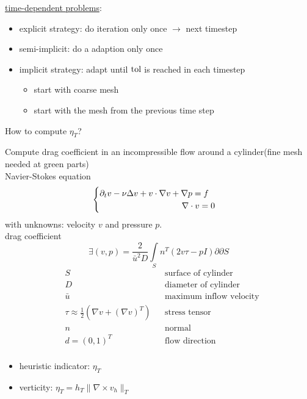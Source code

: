 \underline{time-dependent problems}:
\begin{itemize}
	\item explicit strategy: do iteration only once $\to$ next timestep
	\item semi-implicit: do a adaption only once
	\item implicit strategy: adapt until $\text{tol}$ is reached in each timestep
	\begin{itemize}
		\item start with coarse mesh
		\item start with the mesh from the previous time step
	\end{itemize}
\end{itemize}
How to compute $\eta_T$?\vspace{1cm}
\begin{example}
	Compute drag coefficient in an incompressible flow around a cylinder(fine mesh needed at green parts)\\
	Navier-Stokes equation
	\begin{align*}
	\begin{cases}
	\partial_t v - \nu \laplace v + v \cdot \nabla v + \nabla p = f\\
	\hspace{3.4cm}\nabla \cdot v = 0
	\end{cases}
	\end{align*}
	with unknowns: velocity $v$ and pressure $p$.\\
	drag coefficient 
	\begin{equation*}
		\exists (v,p) = \frac{2}{\bar{u}^2D}\int \limits_S n^T \left(2v \tau -p I\right) \partial \partial S
	\end{equation*}
	\begin{align*}
		&S && \text{surface of cylinder}\\
		&D && \text{diameter of cylinder}\\
		&\bar{u} && \text{maximum inflow velocity}\\
		&\tau \approx \frac{1}{2}(\nabla v + (\nabla v )^T) && \text{stress tensor}\\
		&n && \text{normal}\\
		&d=(0,1)^T && \text{flow direction}\\
	\end{align*}
	\begin{itemize}
		\item heuristic indicator: $\eta_T$
		\item verticity: $\eta_T = h_T \|\nabla \times v_h\|_T$

\end{itemize}
\end{example}
